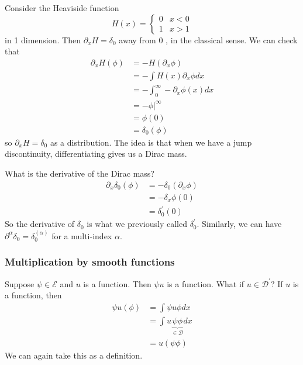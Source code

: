 \begin{example}
    Consider the Heaviside function
    $$
    H(x)= \begin{cases}0 & x<0 \\ 1 & x>1\end{cases}
    $$
    in 1 dimension. Then $\partial_{x} H= \delta _0$ away from 0 , in the classical sense. We can check that
    $$
    \begin{aligned}
    \partial_{x} H(\phi) &=-H\left(\partial_{x} \phi\right) \\
    &=-\int H(x) \partial_{x} \phi d x \\
    &=-\int_{0}^{\infty}-\partial_{x} \phi(x) d x \\
    &=-\left.\phi\right|^{\infty} \\
    &=\phi(0) \\
    &=\delta_{0}(\phi)
    \end{aligned}
    $$
    so $\partial_{x} H=\delta_{0}$ as a distribution. The idea is that when we have a jump discontinuity, differentiating gives us a Dirac mass.
\end{example}

\begin{example}
    What is the derivative of the Dirac mass?
    $$
    \begin{aligned}
    \partial_{x} \delta_{0}(\phi) &=-\delta_{0}\left(\partial_{x} \phi\right) \\
    &=-\delta_{x} \phi(0) \\
    &=\delta_{0}^{\prime}(0)
    \end{aligned}
    $$
    So the derivative of $\delta_{0}$ is what we previously called $\delta_{0}^{\prime}$. Similarly, we can have $\partial^{\alpha} \delta_{0}=\delta_{0}^{(\alpha)}$ for a multi-index $\alpha$.
\end{example}

\subsubsection{Multiplication by smooth functions}
Suppose $\psi \in \mathcal{E}$ and $u$ is a function. Then $\psi u$ is a function. What if $u \in \mathcal{D}^{\prime} ?$ If $u$ is a function, then
$$
\begin{aligned}
\psi u(\phi) &=\int \psi u \phi d x \\
&=\int u \underbrace{\psi \phi}_{\in \mathcal{D}} d x \\
&=u(\psi \phi)
\end{aligned}
$$
We can again take this as a definition.

